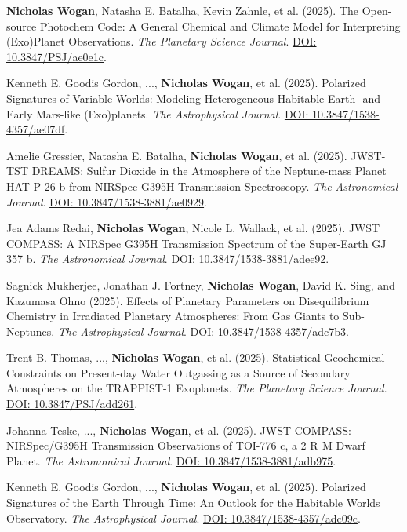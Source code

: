\documentclass[12pt]{article}
\begin{document}
\begin{cvlist}
\item[2025]
  \textbf{Nicholas Wogan}, Natasha E. Batalha, Kevin Zahnle, et al. (2025). The Open-source Photochem Code: A General Chemical and Climate Model for Interpreting (Exo)Planet Observations. \emph{The Planetary Science Journal}. \href{https://doi.org/10.3847/PSJ/ae0e1c}{DOI: 10.3847/PSJ/ae0e1c}.
\item[2025]
  Kenneth E. Goodis Gordon, ..., \textbf{Nicholas Wogan}, et al. (2025). Polarized Signatures of Variable Worlds: Modeling Heterogeneous Habitable Earth- and Early Mars-like (Exo)planets. \emph{The Astrophysical Journal}. \href{https://doi.org/10.3847/1538-4357/ae07df}{DOI: 10.3847/1538-4357/ae07df}.
\item[2025]
  Amelie Gressier, Natasha E. Batalha, \textbf{Nicholas Wogan}, et al. (2025). JWST-TST DREAMS: Sulfur Dioxide in the Atmosphere of the Neptune-mass Planet HAT-P-26 b from NIRSpec G395H Transmission Spectroscopy. \emph{The Astronomical Journal}. \href{https://doi.org/10.3847/1538-3881/ae0929}{DOI: 10.3847/1538-3881/ae0929}.
\item[2025]
  Jea Adams Redai, \textbf{Nicholas Wogan}, Nicole L. Wallack, et al. (2025). JWST COMPASS: A NIRSpec G395H Transmission Spectrum of the Super-Earth GJ 357 b. \emph{The Astronomical Journal}. \href{https://doi.org/10.3847/1538-3881/adee92}{DOI: 10.3847/1538-3881/adee92}.
\item[2025]
  Sagnick Mukherjee, Jonathan J. Fortney, \textbf{Nicholas Wogan}, David K. Sing, and Kazumasa Ohno (2025). Effects of Planetary Parameters on Disequilibrium Chemistry in Irradiated Planetary Atmospheres: From Gas Giants to Sub-Neptunes. \emph{The Astrophysical Journal}. \href{https://doi.org/10.3847/1538-4357/adc7b3}{DOI: 10.3847/1538-4357/adc7b3}.
\item[2025]
  Trent B. Thomas, ..., \textbf{Nicholas Wogan}, et al. (2025). Statistical Geochemical Constraints on Present-day Water Outgassing as a Source of Secondary Atmospheres on the TRAPPIST-1 Exoplanets. \emph{The Planetary Science Journal}. \href{https://doi.org/10.3847/PSJ/add261}{DOI: 10.3847/PSJ/add261}.
\item[2025]
  Johanna Teske, ..., \textbf{Nicholas Wogan}, et al. (2025). JWST COMPASS: NIRSpec/G395H Transmission Observations of TOI-776 c, a 2 R$_{}$ M Dwarf Planet. \emph{The Astronomical Journal}. \href{https://doi.org/10.3847/1538-3881/adb975}{DOI: 10.3847/1538-3881/adb975}.
\item[2025]
  Kenneth E. Goodis Gordon, ..., \textbf{Nicholas Wogan}, et al. (2025). Polarized Signatures of the Earth Through Time: An Outlook for the Habitable Worlds Observatory. \emph{The Astrophysical Journal}. \href{https://doi.org/10.3847/1538-4357/adc09c}{DOI: 10.3847/1538-4357/adc09c}.

\end{cvlist}
\end{document}
